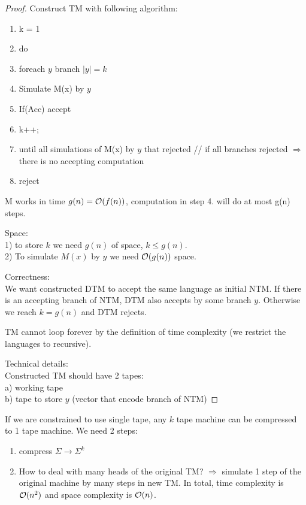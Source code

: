 \begin{proof}
Construct TM with following algorithm:
\begin{enumerate}
	\item k = 1
	\item do
	\item foreach $y$ branch $|y| = k$
	\item Simulate M(x) by $y$
	\item If(Acc) accept
	\item k++;
	\item until all simulations of M(x) by $y$ that rejected
		// if all branches rejected $\Rightarrow$ there is no accepting computation
	\item reject
\end{enumerate}

M works in time $g(n) = \mathcal{O}(f(n))$, computation in step 4. will do at most g(n) steps.

Space:\\
1) to store $k$ we need $g(n)$ of space, $ k \leq g(n) $. \\
2) To simulate $M(x)$ by $y$ we need $\mathcal{O}(g(n))$ space.

Correctness: \\
We want constructed DTM to accept the same language as initial NTM.
If there is an accepting branch of NTM, DTM also accepts by some branch $y$.
Otherwise we reach $k = g(n)$ and DTM rejects.

TM cannot loop forever by the definition of time complexity (we restrict the languages to recursive).

Technical details:\\
Constructed TM should have 2 tapes:\\
a) working tape\\
b) tape to store $y$ (vector that encode branch of NTM)
\end{proof}

\begin{note}
	If we are constrained to use single tape, any $k$ tape machine can be compressed to 1 tape machine. We need 2 steps:

\begin{enumerate}
	\item compress $\Sigma \to \Sigma^k$
	\item How to deal with many heads of the original TM? $\Rightarrow$ simulate 1 step of the original machine by many steps in new TM.
		In total, time complexity is $\mathcal{O}(n^2)$ and space complexity is $\mathcal{O}(n)$.
\end{enumerate}
\end{note}

